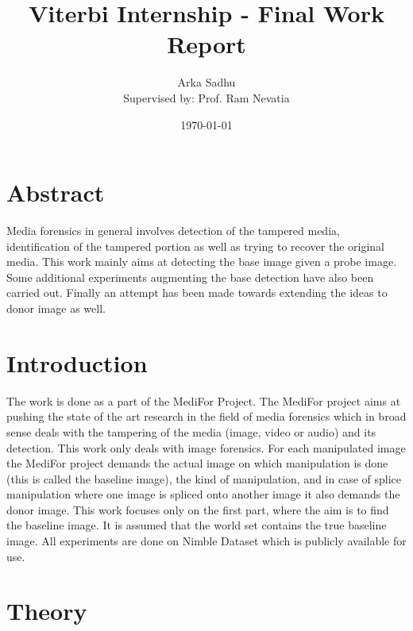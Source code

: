 \documentclass{article}
\title{Viterbi Internship - Final Work Report}
\author{Arka Sadhu\\{ Supervised by: Prof. Ram Nevatia}}
\date{\today}
\begin{document}
\maketitle

\tableofcontents
\newpage
\section{Abstract}
Media forensics in general involves detection of the tampered media, identification of the tampered portion as well as trying to recover the original media. This work mainly aims at detecting the base image given a probe image. Some additional experiments augmenting the base detection have also been carried out. Finally an attempt has been made towards extending the ideas to donor image as well.


\section{Introduction}
The work is done as a part of the MediFor Project. The MediFor project aims at pushing the state of the art research in the field of media forensics which in broad sense deals with the tampering of the media (image, video or audio) and its detection. This work only deals with image forensics. For each manipulated image the MediFor project demands the actual image on which manipulation is done (this is called the baseline image), the kind of manipulation, and in case of splice manipulation where one image is spliced onto another image it also demands the donor image. This work focuses only on the first part, where the aim is to find the baseline image. It is assumed that the world set contains the true baseline image. All experiments are done on Nimble Dataset which is publicly available for use.

\section{Theory}
\end{document}
